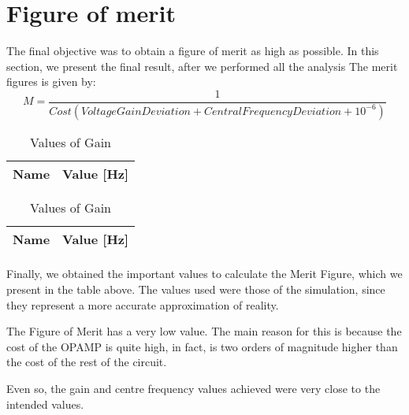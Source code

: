 \section{Figure of merit}
\label{sec:results}

The final objective was to obtain a figure of merit as high as possible. 
In this section, we present the final result, after we performed all the analysis
The merit figures is given by:
\begin{equation}
    M = \frac{1}{Cost (VoltageGainDeviation + CentralFrequencyDeviation + 10^{-6})}  
\end{equation}



\begin{table}[H]
  \centering
  \begin{tabular}{|l|r|}
    \hline    
    {\bf Name} & {\bf Value [Hz] } \\ \hline
    
  \end{tabular}
  \caption{Values of Gain}
  \label{tab:r}
\end{table}

\begin{table}[H]
  \centering
  \begin{tabular}{|l|r|}
    \hline    
    {\bf Name} & {\bf Value [Hz] } \\ \hline
    
  \end{tabular}
  \caption{Values of Gain}
  \label{tab:r}
\end{table}

\paragraph{}

Finally, we obtained the important values to calculate the Merit Figure, which we present in the table above. The values used were those of the simulation, since they represent a more accurate approximation of reality.

The Figure of Merit has a very low value. The main reason for this is because the cost of the OPAMP is quite high, in fact, is two orders of magnitude higher than the cost of the rest of the circuit.

Even so, the gain and centre frequency values achieved were very close to the intended values. 
